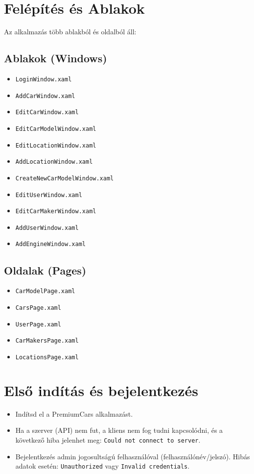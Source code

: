 \documentclass{report}[11pt]
\begin{document}
\section{Felépítés és Ablakok}
Az alkalmazás több ablakból és oldalból áll:

\subsection{Ablakok (Windows)}
\begin{itemize}
\item \texttt{LoginWindow.xaml}
\item \texttt{AddCarWindow.xaml}
\item \texttt{EditCarWindow.xaml}
\item \texttt{EditCarModelWindow.xaml}
\item \texttt{EditLocationWindow.xaml}
\item \texttt{AddLocationWindow.xaml}
\item \texttt{CreateNewCarModelWindow.xaml}
\item \texttt{EditUserWindow.xaml}
\item \texttt{EditCarMakerWindow.xaml}
\item \texttt{AddUserWindow.xaml}
\item \texttt{AddEngineWindow.xaml}
\end{itemize}

\subsection{Oldalak (Pages)}
\begin{itemize}
\item \texttt{CarModelPage.xaml}
\item \texttt{CarsPage.xaml}
\item \texttt{UserPage.xaml}
\item \texttt{CarMakersPage.xaml}
\item \texttt{LocationsPage.xaml}
\end{itemize}

\section{Első indítás és bejelentkezés}
\begin{itemize}
    \item Indítsd el a PremiumCars alkalmazást.
    \item Ha a szerver (API) nem fut, a kliens nem fog tudni kapcsolódni, és a következő hiba jelenhet meg: \texttt{Could not connect to server}.
    \item Bejelentkezés admin jogosultságú felhasználóval (felhasználónév/jelszó). Hibás adatok esetén: \texttt{Unauthorized} vagy \texttt{Invalid credentials}.
\end{itemize}
\end{document}
